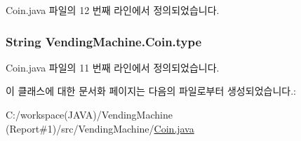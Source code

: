 Coin.\+java 파일의 12 번째 라인에서 정의되었습니다.

\subsubsection[{\texorpdfstring{type}{type}}]{\setlength{\rightskip}{0pt plus 5cm}String Vending\+Machine.\+Coin.\+type\hspace{0.3cm}{\ttfamily [private]}}\hypertarget{class_vending_machine_1_1_coin_a7cd315b148100dbe6872b2afd2220617}{}\label{class_vending_machine_1_1_coin_a7cd315b148100dbe6872b2afd2220617}


Coin.\+java 파일의 11 번째 라인에서 정의되었습니다.



이 클래스에 대한 문서화 페이지는 다음의 파일로부터 생성되었습니다.\+:\begin{DoxyCompactItemize}
\item 
C\+:/workspace(\+J\+A\+V\+A)/\+Vending\+Machine (\+Report\#1)/src/\+Vending\+Machine/\hyperlink{_coin_8java}{Coin.\+java}\end{DoxyCompactItemize}
